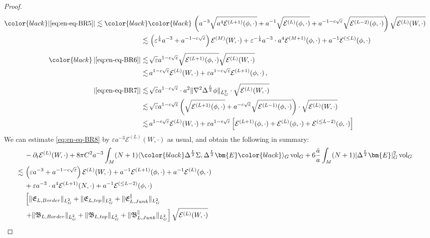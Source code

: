 \documentclass[11pt,leqno,textwidth=10cm]{amsart}
\numberwithin{equation}{section}
\theoremstyle{definition}
\theoremstyle{plain}
\newcommand{\1}{\mathbbm{1}}
\newcommand{\E}{\mathcal{E}}
\newcommand{\vol}[1]{{\text{\normalfont{vol}}}_{#1}}
\renewcommand{\epsilon}{\varepsilon}
\newcommand{\del}{\partial}
\newcommand{\Lap}{\Delta}
\newcommand{\RE}{\bm{E}}
\newcommand{\change}[1]{\color{black}#1\color{black}}
\begin{document}
\begin{proof}
\begin{align*}
\change{\lvert\eqref{eq:en-eq-BR5}\rvert\lesssim}&\change{\,\left(a^{-3}\sqrt{a^4\E^{(L+1)}(\phi,\cdot)}+a^{-1}\sqrt{\E^{(L)}(\phi,\cdot)}+a^{-1-c\sqrt{\epsilon}}\sqrt{\E^{(L-2)}(\phi,\cdot)}\right)\sqrt{\E^{(L)}(W,\cdot)}\\
\lesssim&\,\left(\epsilon^\frac18a^{-3}+a^{-1-c\sqrt{\epsilon}}\right)\E^{(M)}(W,\cdot)+\epsilon^{-\frac18}a^{-3}\cdot a^4\E^{(M+1)}(\phi,\cdot)+a^{-1}\E^{(\leq L)}(\phi,\cdot)\\[0.5em]}
\left\lvert\eqref{eq:en-eq-BR6}\right\rvert\lesssim&\,\sqrt{\epsilon}a^{1-c\sqrt{\epsilon}}\sqrt{\E^{(L+1)}(\phi,\cdot)}\sqrt{\E^{(L)}(W,\cdot)}\\
\lesssim&\,a^{1-c\sqrt{\epsilon}}\E^{(L)}(W,\cdot)+\epsilon a^{1-c\sqrt{\epsilon}}\E^{(L+1)}(\phi,\cdot)\,,\\[0.5em]
\left\lvert\eqref{eq:en-eq-BR7}\right\rvert\lesssim&\,\sqrt{\epsilon}a^{1-c\sqrt{\epsilon}}\cdot a^2\|\nabla^2\Lap^{\frac{L}2}\phi\|_{L^2_G}\cdot\sqrt{\E^{(L)}(W,\cdot)}\\
\lesssim&\,\sqrt{\epsilon}a^{1-c\sqrt{\epsilon}}\left(\sqrt{\E^{(L+1)}(\phi,\cdot)}+a^{-c\sqrt{\epsilon}}\sqrt{\E^{(L-1)}(\phi,\cdot)}\right)\cdot\sqrt{\E^{(L)}(W,\cdot)}\,\\
\lesssim&\,a^{1-c\sqrt{\epsilon}}\E^{(L)}(W,\cdot)+\epsilon a^{1-c\sqrt{\epsilon}}\left[\E^{(L+1)}(\phi,\cdot)+\E^{(L)}(\phi,\cdot)+\E^{(\leq L-2)}(\phi,\cdot)\right]
\end{align*}
We can estimate \eqref{eq:en-eq-BR8} by $\epsilon a^{-3}\E^{(L)}(W,\cdot)$ as usual, and obtain the following in summary:
\begin{align*}
&\,-\del_t\E^{(L)}(W,\cdot)+8\pi C^2a^{-3}\int_M(N+1)\langle \change{\Lap^\frac{L}2\Sigma,\Lap^\frac{L}2\RE}\rangle_G\,\vol{G}+6\frac{\dot{a}}a\int_M(N+1)\lvert\Lap^\frac{L}2\RE\rvert_G^2\,\vol{G}\\
\lesssim&\,\left(\epsilon a^{-3}+a^{-1-c\sqrt{\epsilon}}\right)\E^{(L)}(W,\cdot)+a^{-1}\E^{(L+1)}(\phi,\cdot)+a^{-1}\E^{(L)}(\phi,\cdot)\\
&\,+\epsilon a^{-3}\cdot a^{4}\E^{(L+1)}(N,\cdot)+a^{-1}\E^{(\leq L-2)}(\phi,\cdot)\\
&\,\left[\|\mathfrak{E}_{L,Border}\|_{L^2_G}+\|\mathfrak{E}_{L,top}\|_{L^2_G}+\|\mathfrak{E}_{L,Junk}^\parallel\|_{L^2_G}\right.\\
&\,\left.+\|\mathfrak{B}_{L,Border}\|_{L^2_G}+\|\mathfrak{B}_{L,top}\|_{L^2_G}+\|\mathfrak{B}_{L,Junk}^\parallel\|_{L^2_G}\right]\sqrt{\E^{(L)}(W,\cdot)}
\end{align*}

\end{proof}
\end{document}
